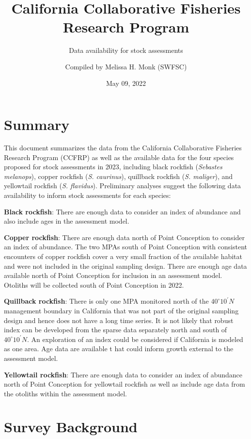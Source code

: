 \documentclass[
]{article}
\title{California Collaborative Fisheries Research Program}
\subtitle{Data availability for stock assessments}
\author{Compiled by Melissa H. Monk (SWFSC)}
\date{May 09, 2022}
\begin{document}
\maketitle

\newcommand\CapeM{$40^\circ 10^\prime N$}

\hypertarget{summary}{%
\section{Summary}\label{summary}}

This document summarizes the data from the California Collaborative
Fisheries Research Program (CCFRP) as well as the available data for the four
species proposed for stock assessments in 2023, including black rockfish (\emph{Sebastes melanops}),
copper rockfish (\emph{S. caurinus}), quillback rockfish (\emph{S. maliger}), and
yellowtail rockfish (\emph{S. flavidus}). Preliminary analyses suggest the following
data availability to inform stock assessments for each species:

\textbf{Black rockfish}: There are enough data to consider an index of abundance and also
include ages in the assessment model.

\textbf{Copper rockfish}: There are enough data north of Point Conception to consider an
index of abundance. The two MPAs south of Point Conception with consistent encounters
of copper rockfish cover a very small fraction of the available habitat and were not
included in the original sampling design. There are enough age data available north
of Point Conception for inclusion in an assessment model. Otoliths will be
collected south of Point Conception in 2022.

\textbf{Quillback rockfish}: There is only one MPA monitored north of the $40^\circ 10^\prime N$ management
boundary in California that was not part of the original sampling design and hence
does not have a long time series. It is not likely that robust index can be developed
from the sparse data separately north and south of $40^\circ 10^\prime N$. An exploration of an index
could be considered if California is modeled as one area. Age data are available t
hat could inform growth external to the assessment model.

\textbf{Yellowtail rockfish}: There are enough data to consider an index of abundance north of
Point Conception for yellowtail rockfish as well as include age data from the otoliths
within the assessment model.

\hypertarget{survey-background}{%
\section{Survey Background}\label{survey-background}}
\end{document}
